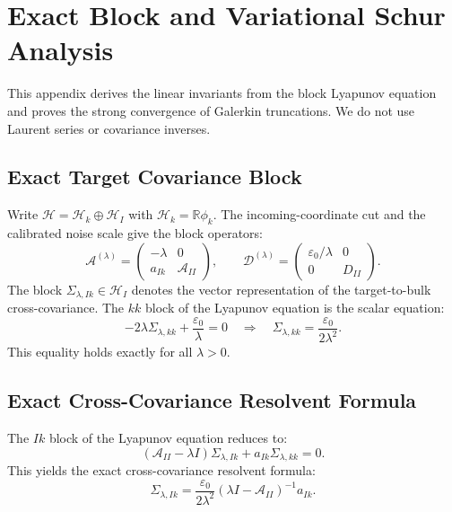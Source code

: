 \section{Exact Block and Variational Schur Analysis}
\label{app:block_cumulant_analysis}

This appendix derives the linear invariants from the block Lyapunov equation and proves the strong convergence of Galerkin truncations. We do not use Laurent series or covariance inverses.

\subsection{Exact Target Covariance Block}

Write $\mathcal{H}=\mathcal{H}_k\oplus\mathcal{H}_I$ with $\mathcal{H}_k=\mathbb{R}\phi_k$. The incoming-coordinate cut and the calibrated noise scale give the block operators:
\begin{equation}
 \mathcal{A}^{(\lambda)}=
 \begin{pmatrix}-\lambda&0\\a_{Ik}&\mathcal{A}_{II}\end{pmatrix},\qquad
 \mathcal{D}^{(\lambda)}=
 \begin{pmatrix}\varepsilon_0/\lambda&0\\0&D_{II}\end{pmatrix}.
 \label{eq:exact_blocks}
\end{equation}
The block $\Sigma_{\lambda,Ik}\in\mathcal{H}_I$ denotes the vector representation of the target-to-bulk cross-covariance.
The $kk$ block of the Lyapunov equation is the scalar equation:
\begin{equation}
  -2\lambda\Sigma_{\lambda,kk}+\frac{\varepsilon_0}{\lambda}=0 \quad \Longrightarrow \quad \Sigma_{\lambda,kk}=\frac{\varepsilon_0}{2\lambda^2}.
  \label{eq:Sigmakk_exact}
\end{equation}
This equality holds exactly for all $\lambda > 0$.

\subsection{Exact Cross-Covariance Resolvent Formula}

The $Ik$ block of the Lyapunov equation reduces to:
\begin{equation}
  (\mathcal{A}_{II}-\lambda I)\Sigma_{\lambda,Ik}+a_{Ik}\Sigma_{\lambda,kk}=0.
\end{equation}
This yields the exact cross-covariance resolvent formula:
\begin{equation}
 \Sigma_{\lambda,Ik}=\frac{\varepsilon_0}{2\lambda^2} (\lambda I-\mathcal{A}_{II})^{-1}a_{Ik}.
 \label{eq:SigmaIk_exact_vector}
\end{equation}

